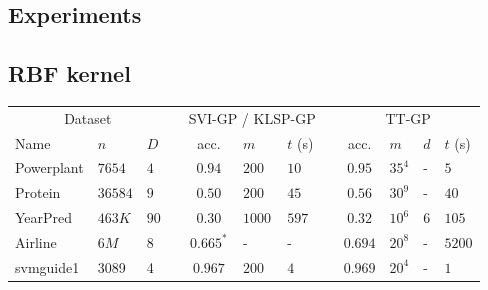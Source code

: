 \documentclass[a0,portrait]{a0poster}
\begin{document}
\begin{multicols}{2}
\section*{\LARGE \color{NavyBlue} Experiments}
\subsection*{\large \color{NavyBlue} RBF kernel}

\begin{center}
  \begin{tabular}{lll l cll l clll}
    \toprule
    \multicolumn{3}{c}{Dataset} && \multicolumn{3}{c}{SVI-GP / KLSP-GP} && \multicolumn{4}{c}{TT-GP} \\
    \cmidrule{1-3}
    \cmidrule{5-7}
    \cmidrule{9-12}

    Name & $n$ & $D$ &&
    acc. & $m$ & $t$ (s) &&
    acc. & $m$ & $d$ & $t$ (s)\\
    \midrule

    Powerplant & $7654$ & $4$ &&
    $0.94$ & $200$ & $10$ &&
    $0.95$ & $35^4$ & - & $5$ \\

    Protein & $36584$ & $9$ &&
    $0.50$ & $200$ & $45$ &&
    $0.56$ & $30^9$ & - & $40$ \\

    YearPred & $463K$ & $90$ &&
    $0.30$ & $1000$ & $597$ &&
    $0.32$ & $10^6$ & $6$ & $105$ \\

    \midrule
    Airline & $6M$ & $8$ &&
    $0.665^*$ & - & - &&
    $0.694$ & $20^8$ & - & $5200$ \\

    svmguide1 & 3089 & 4 &&
    $0.967$ & $200$ & $4$ &&
    $0.969$ & $20^4$ & - & $1$\\


\end{tabular}
\end{center}
\end{multicols}
\end{document}
